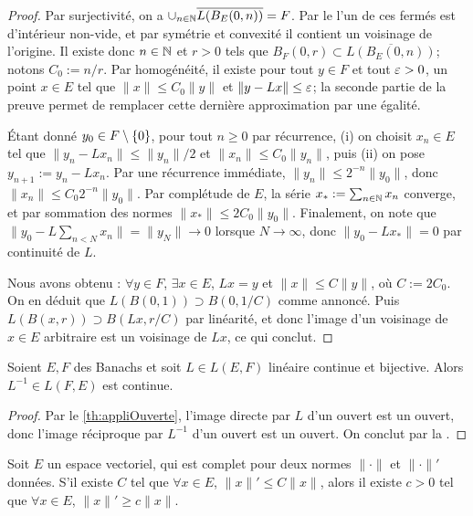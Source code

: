\begin{proof}
	Par surjectivité, on a $\cup_{n \in \mathbb{N}} \overline {L(B_E(0,n))} = F$. Par le  l'un de ces fermés est d'intérieur non-vide, et par symétrie et convexité il contient un voisinage de l'origine. 
	Il existe donc $n \in \mathbb{N}$ et $r>0$ tels que $B_F(0,r) \subset \overline{L(B_E(0,n))}$; notons $C_0 := n/r$.
	Par homogénéité, il existe pour tout $y\in F$ et tout $\varepsilon>0$, un point $x \in E$ tel que $\|x\| \leq C_0 \|y\|$ et $\|y-Lx\| \leq \varepsilon$; la seconde partie de la preuve permet de remplacer cette dernière approximation par une égalité.
	
	Étant donné $y_0 \in F\setminus \{0\}$, pour tout $n \geq 0$ par récurrence, (i) on choisit $x_n\in E$ tel que $\|y_n-Lx_n\| \leq \|y_n\|/2$ et $\|x_n\| \leq C_0 \|y_n\|$, puis (ii) on pose $y_{n+1} := y_n-L x_n$. Par une récurrence immédiate, $\|y_n\| \leq 2^{-n} \|y_0\|$, donc $\|x_n\| \leq C_0 2^{-n} \|y_0\|$. Par complétude de $E$, la série $x_* := \sum_{n \in \mathbb{N}} x_n$ converge, et par sommation des normes $\|x_*\| \leq 2 C_0 \|y_0\|$.
	Finalement, on note que $\|y_0 - L\sum_{n<N} x_n\| = \|y_N\| \to 0$ lorsque $N \to \infty$, donc $\|y_0-Lx_*\|=0$ par continuité de $L$.
	
	Nous avons obtenu : $\forall y\in F$, $\exists x \in E$, $Lx = y$ et $\|x\| \leq C \|y\|$, où $C := 2 C_0$. 
	On en déduit que $L(B(0,1)) \supset B(0,1/C)$ comme annoncé. Puis $L(B(x,r)) \supset B(Lx,r/C)$ par linéarité, et donc l'image d'un voisinage de $x\in E$ arbitraire est un voisinage de $Lx$, ce qui conclut. 
\end{proof}


\begin{corollary}
\label{corol:isomBanach}
%
	Soient $E,F$ des Banachs et soit $L \in L(E,F)$ linéaire continue et bijective. Alors $L^{-1} \in L(F,E)$ est continue.
\end{corollary}

\begin{proof}
Par le \cref{th:appliOuverte}, l'image directe par $L$ d'un ouvert est un ouvert, donc l'image réciproque par $L^{-1}$ d'un ouvert est un ouvert. On conclut par la .
\end{proof}

\begin{corollary}
\label{corol:equivNormes}
%
	Soit $E$ un espace vectoriel, qui est complet pour deux normes $\|\cdot\|$ et $\|\cdot\|'$ données. 
	S'il existe $C$ tel que $\forall x \in E$, $\|x\|' \leq C \|x\|$, alors il existe $c>0$ tel que $\forall x \in E$, $\|x\|' \geq c \|x\|$.
\end{corollary}

